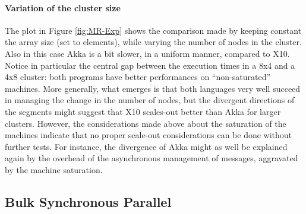 \documentclass[a4paper]{article}
\numberwithin{equation}{section}
\begin{document}
\paragraph{Variation of the cluster size}
The plot in Figure \ref{fig:MR-Exp} shows the comparison 
made by keeping constant the array size (set to
 elements), while varying the number of nodes
in the cluster. Also in this case Akka is a bit slower, in a
uniform manner, compared to X10.
Notice in particular the central gap between the execution times in
a 8x4 and a 4x8 cluster: both programs have better
performances on ``non-saturated'' machines.
More generally, what emerges is that
both languages very well succeed in managing the change in the number 
of nodes, but the divergent directions of the segments 
might suggest that X10 scales-out better than Akka for larger
clusters. 
However, the considerations made above about the saturation of the 
machines indicate that no proper scale-out considerations can be
done without further tests.
For instance, the divergence of Akka might as well be explained
again by the overhead of the asynchronous management of messages,
aggravated by the machine saturation.


\subsection{Bulk Synchronous Parallel}
\end{document}
